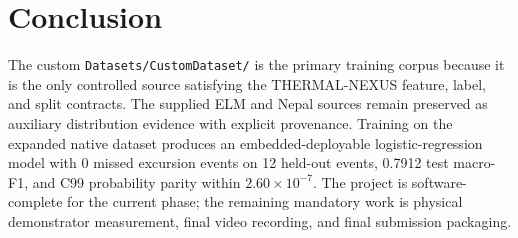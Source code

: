 \documentclass[11pt,a4paper]{article}
\begin{document}
\section{Conclusion}
The custom \texttt{Datasets/CustomDataset/} is the primary training corpus
because it is the only controlled source satisfying the THERMAL-NEXUS feature,
label, and split contracts. The supplied ELM and Nepal sources remain preserved
as auxiliary distribution evidence with explicit provenance. Training on the
expanded native dataset produces an embedded-deployable logistic-regression
model with 0 missed excursion events on 12 held-out events, 0.7912 test macro-F1,
and C99 probability parity within $2.60 \times 10^{-7}$. The project is
software-complete for the current phase; the remaining mandatory work is
physical demonstrator measurement, final video recording, and final submission
packaging.
\end{document}
